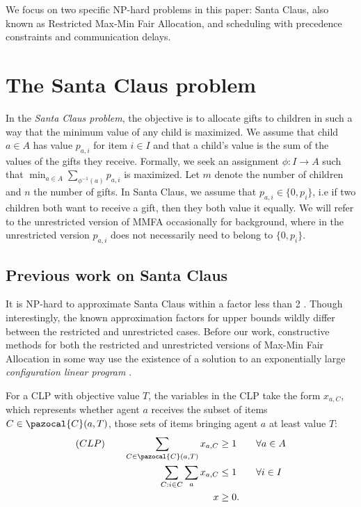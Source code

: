 \bigskip

We focus on two specific NP-hard problems in this paper: Santa Claus, also known as Restricted Max-Min Fair Allocation, and scheduling 
with precedence constraints and communication delays.

\section{The Santa Claus problem}

In the \emph{Santa Claus problem}, the objective is to allocate gifts to children in such a way that the minimum value of any child is maximized. 
We assume that child $a \in A$ has value $p_{a,i}$ for item $i \in I$ and that a child's value is the sum of the values of the gifts they receive. 
Formally, we seek an assignment $\phi: I \rightarrow A$ such that $\min_{a \in A} \sum_{\phi^{-1}(a)} p_{a,i}$ is maximized. 
Let $m$ denote the number of children and $n$ the number of gifts. 
In Santa Claus, we assume that $p_{a,i} \in \{0,p_i\}$, i.e if two children both want to receive a gift, then they both value it equally.
We will refer to the unrestricted version of MMFA occasionally for background, 
where in the unrestricted version $p_{a,i}$ does not necessarily need to belong to $\{0,p_i\}$.

\subsection{Previous work on Santa Claus}


It is NP-hard to approximate Santa Claus within 
a factor less than 2 \cite{BezakovaD05}. 
Though interestingly, the known approximation factors for upper bounds wildly differ between the 
restricted and unrestricted cases. 
Before our work, constructive methods for both the restricted and unrestricted versions of 
Max-Min Fair Allocation in some way use the existence of a solution to an exponentially large
\textit{configuration linear program}  \cite{SantaClaus-BansalSviridenko-STOC2006, AlgoForSantaClaus-AnnamalaiKalaitzisSvenssonSODA15, AS10, MaxMinFairAllocation-ChakrabartyChuzhoyKhannaFOCS09, ChengM18}.
 
For a CLP with objective value $T$, 
the variables in the CLP take the form $x_{a,C}$, 
which represents whether agent $a$ receives the subset of items $C \in  \pazocal{C}(a,T)$, 
those sets of items bringing agent $a$ at least value $T$:
\begin{align*}(CLP) \qquad
\sum_{C \in \pazocal{C}(a,T)} x_{a,C} &\geq 1  \qquad \forall a \in A \\
\sum_{C: i \in C} \sum_{a} x_{a,C} &\leq 1 \qquad \forall i \in I \\ 
x &\geq 0.
\end{align*}

